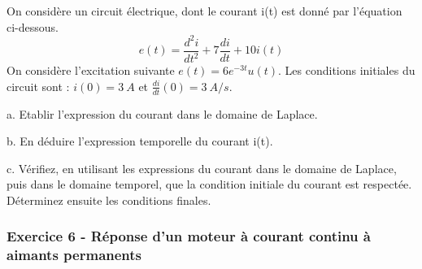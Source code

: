 	On considère un circuit électrique, dont le courant i(t) est donné par l'équation ci-dessous.
	\begin{equation*}
	e(t)=\frac{d^{2}i}{dt^{2}}+7\frac{di}{dt}+10i(t)
	\end{equation*}
	On considère l'excitation suivante $e(t)=6e^{-3t}u(t)$. Les conditions initiales du circuit sont : $i(0) = 3~A$ et $\frac{di}{dt}(0)=3~A/s$.
	
	
	a. Etablir l'expression du courant dans le domaine de Laplace.
	
	b. En déduire l'expression temporelle du courant i(t).
	
	c. Vérifiez, en utilisant les expressions du courant dans le domaine de Laplace, puis dans le domaine temporel, que la condition initiale du courant est respectée. Déterminez ensuite les conditions finales. 
	
	\vspace{1\baselineskip}
	
	\subsubsection{Exercice 6 - Réponse d'un moteur à courant continu à aimants permanents}
	
